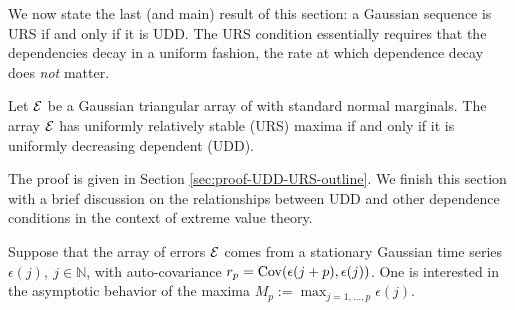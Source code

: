 % 

We now state the last (and main) result of this section: a Gaussian sequence is URS if and only if it is UDD.
The URS condition essentially requires that the dependencies decay in a uniform fashion, the rate at which dependence decay does \emph{not} matter.

\begin{theorem} \label{thm:Gaussian-weak-dependence}
Let ${\cal E}$ be a Gaussian triangular array of with standard normal marginals.  
The array ${\cal E}$ has uniformly relatively stable (URS) maxima if and only if it is uniformly decreasing dependent (UDD).
\end{theorem}

The proof is given in Section \ref{sec:proof-UDD-URS-outline}. We finish this section with a brief discussion on the relationships between UDD and other dependence conditions in the context of extreme value theory.

Suppose that the array of errors  ${\cal E}$ comes from a stationary Gaussian time series $\epsilon(j),\ j\in \mathbb{N}$, with auto-covariance $r_p={\rm {Cov}}(\epsilon(j+p),\epsilon(j))$. 
One is interested in the asymptotic behavior of the maxima $M_p:=\max_{j=1,\dots,p} \epsilon(j)$.


